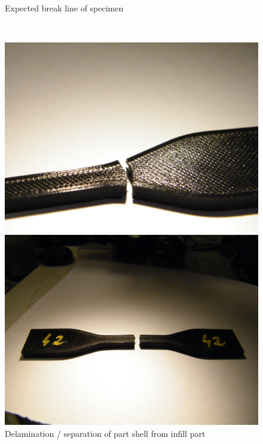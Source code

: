 \documentclass[a4paper, 11pt, reqno]{report}
\begin{document}
\begin{figure}[h!]
\begin{minipage}[b]{0.48\textwidth}
  \end{minipage}
  \\[1pt]
  \begin{minipage}[t]{0.48\textwidth}
    \caption{Expected break line of specimen}
  \end{minipage}
  \hfill
  \begin{minipage}[t]{0.48\textwidth}
    \caption{Delamination / separation of part shell from infill part}
  \end{minipage}
  \\[20pt]
 \begin{minipage}[b]{0.48\textwidth}
    \includegraphics[width=\textwidth]{1}
  \end{minipage}
  \hfill
  \begin{minipage}[b]{0.48\textwidth}
    \includegraphics[width=\textwidth]{7}

\end{minipage}
\end{figure}
\end{document}
